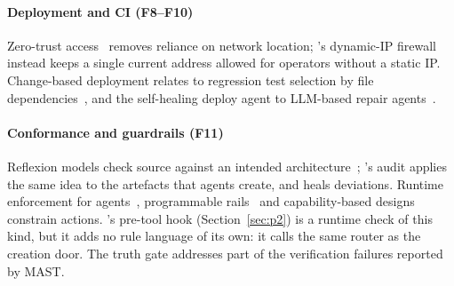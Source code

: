 \paragraph*{Deployment and CI (F8--F10)} Zero-trust access~\cite{ward2014beyondcorp} removes reliance on network location; \sys's dynamic-IP firewall instead keeps a single current address allowed for operators without a static IP. Change-based deployment relates to regression test selection by file dependencies~\cite{gligoric2015ekstazi}, and the self-healing deploy agent to LLM-based repair agents~\cite{bouzenia2025repairagent}.

\paragraph*{Conformance and guardrails (F11)} Reflexion models check source against an intended architecture~\cite{murphy1995reflexion}; \sys's audit applies the same idea to the artefacts that agents create, and heals deviations. Runtime enforcement for agents~\cite{wang2026agentspec}, programmable rails~\cite{rebedea2023nemo} and capability-based designs~\cite{debenedetti2026camel,saltzer1975protection} constrain actions. \sys's pre-tool hook (Section~\ref{sec:p2}) is a runtime check of this kind, but it adds no rule language of its own: it calls the same router as the creation door. The truth gate addresses part of the verification failures reported by MAST.
